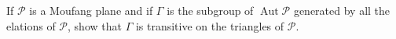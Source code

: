 If $\mathcal{P}$ is a Moufang plane and if $\Gamma$ is the subgroup of $\operatorname{Aut}\mathcal{P}$ generated by all the elations of $\mathcal{P}$, show that $\Gamma$ is transitive on the triangles of $\mathcal{P}$.
